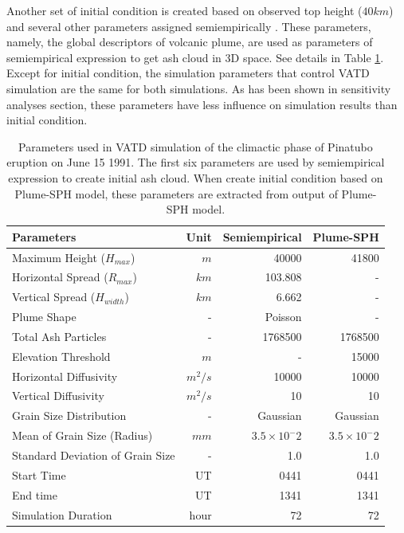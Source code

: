 \documentclass[draft,linenumbers]{agujournal2019}
\begin{document}
Another set of initial condition is created based on observed top height ($40 km$) and several other parameters assigned semiempirically \citep{bursik2012estimation}. These parameters, namely, the global descriptors of volcanic plume, are used as parameters of semiempirical expression to get ash cloud in 3D space. See details in Table \ref{tab:input_parameter_Puff_simulation}. Except for initial condition, the simulation parameters that control VATD simulation are the same for both simulations. As has been shown in sensitivity analyses section, these parameters have less influence on simulation results than initial condition.
 
\begin{table}[htp]
\centering
      \caption{Parameters used in VATD simulation of the climactic phase of Pinatubo eruption on June 15 1991. The first six parameters are used by semiempirical expression to create initial ash cloud. When create initial condition based on Plume-SPH model, these parameters are extracted from output of Plume-SPH model.}
	  \begin{tabular}{lrrr}
	    \hline
	    Parameters & Unit & Semiempirical & Plume-SPH \\
	    \hline
	    Maximum Height ($H_{max}$) & $m$ & 40000 & 41800 \\
	    Horizontal Spread ($R_{max}$) & $km$ & 103.808 & -\\
	    Vertical Spread ($H_{width}$) & $km$ & 6.662  & - \\
	    Plume Shape & - & Poisson & - \\
	    Total Ash Particles  & - & 1768500 & 1768500 \\
	    Elevation Threshold & $m$ & - &  15000 \\
	    Horizontal Diffusivity & $m^2/s$ &10000 & 10000\\
	    Vertical Diffusivity & $m^2/s$ & 10 & 10 \\
	    Grain Size Distribution & - & Gaussian & Gaussian  \\
	    Mean of Grain Size (Radius) & $mm$ & $3.5 \times 10 ^-2$ & $3.5 \times 10 ^-2$ \\
	    Standard Deviation of Grain Size & - &  1.0 & 1.0 \\
	    	Start Time & UT & 0441 & 0441 \\
	    End time & UT & 1341 & 1341 \\
	    Simulation Duration & hour & 72 & 72 \\
	    \hline
	  \end{tabular}
	  \label{tab:input_parameter_Puff_simulation}
\end{table}
\end{document}
